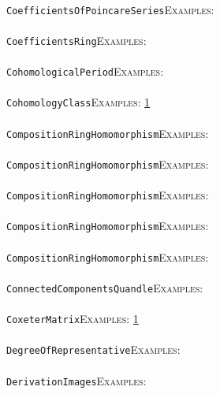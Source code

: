 \documentclass[a4paper,11pt]{report}
\begin{document}
{{ \\
 \texttt{CoefficientsOfPoincareSeries}{\nobreakspace}{\nobreakspace}{\nobreakspace}{\nobreakspace}\textsc{Examples:} \\
 \\
 \texttt{CoefficientsRing}{\nobreakspace}{\nobreakspace}{\nobreakspace}{\nobreakspace}\textsc{Examples:} \\
 \\
 \texttt{CohomologicalPeriod}{\nobreakspace}{\nobreakspace}{\nobreakspace}{\nobreakspace}\textsc{Examples:} \\
 \\
 \texttt{CohomologyClass}{\nobreakspace}{\nobreakspace}{\nobreakspace}{\nobreakspace}\textsc{Examples:} \href{../www/SideLinks/About/aboutGouter.html} {1}{\nobreakspace} \\
 \\
 \texttt{CompositionRingHomomorphism}{\nobreakspace}{\nobreakspace}{\nobreakspace}{\nobreakspace}\textsc{Examples:} \\
 \\
 \texttt{CompositionRingHomomorphism}{\nobreakspace}{\nobreakspace}{\nobreakspace}{\nobreakspace}\textsc{Examples:} \\
 \\
 \texttt{CompositionRingHomomorphism}{\nobreakspace}{\nobreakspace}{\nobreakspace}{\nobreakspace}\textsc{Examples:} \\
 \\
 \texttt{CompositionRingHomomorphism}{\nobreakspace}{\nobreakspace}{\nobreakspace}{\nobreakspace}\textsc{Examples:} \\
 \\
 \texttt{CompositionRingHomomorphism}{\nobreakspace}{\nobreakspace}{\nobreakspace}{\nobreakspace}\textsc{Examples:} \\
 \\
 \texttt{ConnectedComponentsQuandle}{\nobreakspace}{\nobreakspace}{\nobreakspace}{\nobreakspace}\textsc{Examples:} \\
 \\
 \texttt{CoxeterMatrix}{\nobreakspace}{\nobreakspace}{\nobreakspace}{\nobreakspace}\textsc{Examples:} \href{../www/SideLinks/About/aboutDavisComplex.html} {1}{\nobreakspace} \\
 \\
 \texttt{DegreeOfRepresentative}{\nobreakspace}{\nobreakspace}{\nobreakspace}{\nobreakspace}\textsc{Examples:} \\
 \\
 \texttt{DerivationImages}{\nobreakspace}{\nobreakspace}{\nobreakspace}{\nobreakspace}\textsc{Examples:} \\
}}
\end{document}
